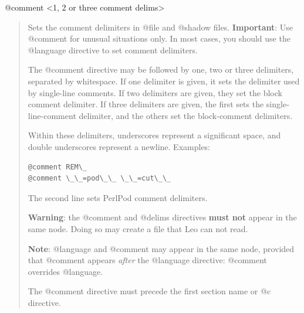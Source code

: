 \documentclass[a4paper,10pt,english]{sphinxmanual}
\begin{document}
@comment \textless{}1, 2 or three comment delims\textgreater{}
\begin{quote}

Sets the comment delimiters in @file and @shadow files.
\textbf{Important}: Use @comment for unusual situations only. In most cases, you
should use the @language directive to set comment delimiters.

The @comment directive may be followed by one, two or three delimiters,
separated by whitespace. If one delimiter is given, it sets the delimiter
used by single-line comments. If two delimiters are given, they set the
block comment delimiter. If three delimiters are given, the first sets the
single-line-comment delimiter, and the others set the block-comment
delimiters.

Within these delimiters, underscores represent a significant space, and
double underscores represent a newline. Examples:

\begin{Verbatim}[commandchars=\\\{\}]
@comment REM\_
@comment \_\_=pod\_\_ \_\_=cut\_\_
\end{Verbatim}

The second line sets PerlPod comment delimiters.

\textbf{Warning}: the @comment and @delims directives \textbf{must not} appear in
the same node. Doing so may create a file that Leo can not read.

\textbf{Note}: @language and @comment may appear in the same node, provided
that @comment appears \emph{after} the @language directive: @comment overrides
@language.

The @comment directive must precede the first section name or @c
directive.
\end{quote}
\end{document}
